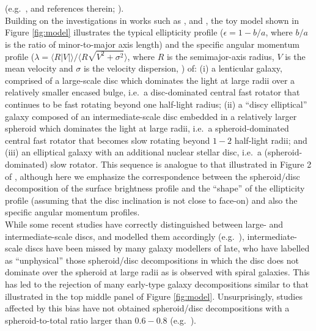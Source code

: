 \documentclass[useAMS,usenatbib,article]{mnras}
\begin{document}
{(e.g.~\citealt{franxillingworth1988ic1459,bender1990,rixwhite1992,scorzabender1995}, and references therein; \citealt{scorza1998}). \\
Building on the investigations in works such as \cite{liller1966}, \cite{Jedrzejewski1987INPROCEEDINGS} and \cite{rixwhite1990}, 
the toy model shown in Figure \ref{fig:model} illustrates the typical ellipticity profile 
($\epsilon = 1 - b/a$, where $b/a$ is the ratio of minor-to-major axis length) 
and the specific angular momentum profile 
($\lambda = \langle R |V| \rangle / \langle R \sqrt{V^2 + \sigma^2} \rangle$, 
where $R$ is the semimajor-axis radius, $V$ is the mean velocity and $\sigma$ is the velocity dispersion, \citealt{emsellem2007}) 
of: 
(i) a lenticular galaxy, 
comprised of a large-scale disc which dominates the light at large radii over a relatively smaller encased bulge,  
i.e.~a disc-dominated central fast rotator that continues to be fast rotating beyond one half-light radius; 
(ii) a ``discy elliptical'' galaxy \citep{michard1984,nieto1988} 
composed of an intermediate-scale disc embedded in a relatively larger spheroid which dominates the light at large radii,
i.e.~a spheroid-dominated central fast rotator that becomes slow rotating beyond $1-2$ half-light radii; and  
(iii) an elliptical galaxy with an additional nuclear stellar disc, 
i.e.~a (spheroid-dominated) slow rotator. 
This sequence is analogue to that illustrated in Figure 2 of \cite{cappellari2011kmdr}, 
although here we emphasize the correspondence between the spheroid/disc decomposition of the surface brightness profile 
and the ``shape'' of the ellipticity profile (assuming that the disc inclination is not close to face-on) 
and also the specific angular momentum profiles. \\
While some recent studies have correctly distinguished between large- and intermediate-scale discs, 
and modelled them accordingly (e.g.~\citealt{kormendybender2012,krajnovic2013}), 
intermediate-scale discs have been missed by many galaxy modellers of late, 
who have labelled as ``unphysical'' \citep{allen2006} those spheroid/disc decompositions 
in which the disc does not dominate over the spheroid at large radii 
as is observed with spiral galaxies. 
This has led to the rejection of many early-type galaxy decompositions 
similar to that illustrated in the top middle panel of Figure \ref{fig:model}. 
Unsurprisingly, studies affected by this bias have not obtained spheroid/disc decompositions with a spheroid-to-total ratio larger than $0.6 - 0.8$ 
(e.g.~\citealt{gadotti2008,head2014,querejeta2015,mendezabreu2015}). \\
}
\end{document}
